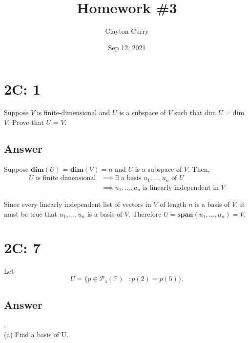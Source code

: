 \documentclass[
	12pt, %
]{fphw}
\title{Homework \#3} %
\author{Clayton Curry} %
\date{Sep 12, 2021} %
\institute{University of Oklahoma \\ Department of Mathematics} %
\newcommand\0{\mathbf{0}}
\newcommand\set[1]{\{#1\}}
\newcommand\qed{\text{$\blacksquare$}}
\newcommand\F[1]{\text{$\mathbb{F}^{#1}$}}
\newcommand\ls[2]{\text{$#1_1, \ldots, #1_{#2}$}}
\newcommand\poly[1]{\text{$\mathcal{P}_{#1}(\F{})$ }}
\newcommand\spann[1]{\mathbf{span}(#1)}
\renewcommand\dim[1]{\mathbf{dim}(#1)}
\begin{document}
\maketitle %


\section*{2C: 1}

\begin{problem}
Suppose $V$ is finite-dimensional and $U$ is a subspace of $V$ such that
dim $U$ = dim $V$. Prove that $U$ = $V$.
\end{problem}


\subsection*{Answer} 
Suppose $\dim{U}$ = $\dim{V} = n$ and $U$ is a subspace of $V$. Then,
\begin{align*}
U \text{ is finite dimensional} &\implies \exists \text{ a basis } \ls{u}{n} \text{ of } U\\
&\implies \ls{u}{n} \text{ is linearly independent in } V
\end{align*}

Since every linearly independent list of vectors in $V$ of length $n$ is a basis of $V$, it must be true that $\ls{u}{n}$ is a basis of $V$. Therefore $U = \spann{\ls{u}{n}} = V$. \qed
\newpage
\section*{2C: 7}
\begin{problem}
Let
$$
U = \set{p \in \poly{4} : p(2)=p(5)}.
$$
\end{problem}


\subsection*{Answer} .\\
(a) Find a basis of U.
\end{document}
